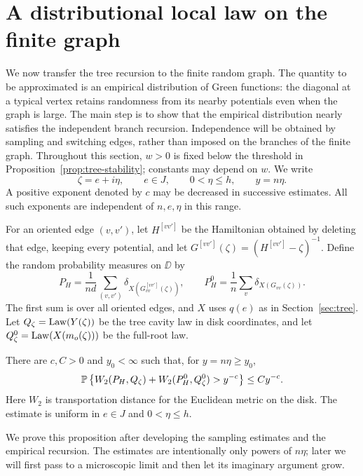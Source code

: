 \section{A distributional local law on the finite graph}
\label{sec:local-law}

We now transfer the tree recursion to the finite random graph.  The
quantity to be approximated is an empirical distribution of Green
functions: the diagonal at a typical vertex retains randomness from its
nearby potentials even when the graph is large.  The main step is to
show that the empirical distribution nearly satisfies the independent
branch recursion.  Independence will be obtained by sampling and
switching edges, rather than imposed on the branches of the finite graph.
Throughout this section, $w>0$ is fixed below the threshold in
Proposition~\ref{prop:tree-stability}; constants may depend on $w$.
We write
\[
 \zeta=e+i\eta,\qquad e\in J,\qquad 0<\eta\le h,
 \qquad y=n\eta.
\]
A positive exponent denoted by $c$ may be decreased in successive estimates.
All such exponents are independent of $n,e,\eta$ in this range.

For an oriented edge $(v,v')$, let $H^{[vv']}$ be the Hamiltonian obtained
by deleting that edge, keeping every potential, and let
$G^{[vv']}(\zeta)=(H^{[vv']}-\zeta)^{-1}$.  Define the random probability
measures on $\DD$ by
\begin{equation}\label{eq:empirical-cavity-laws}
 P_H=\frac1{nd}\sum_{(v,v')}\delta_{X(G^{[vv']}_{vv}(\zeta))},
 \qquad
 P_H^0=\frac1n\sum_v\delta_{X(G_{vv}(\zeta))}.
\end{equation}
The first sum is over all oriented edges, and $X$ uses $q(e)$ as in
Section~\ref{sec:tree}.  Let $Q_\zeta=\operatorname{Law}(Y(\zeta))$ be the tree cavity
law in disk coordinates, and let
$Q_\zeta^0=\operatorname{Law}(X(m_o(\zeta)))$ be the full-root law.

\begin{proposition}\label{prop:local-law}
There are $c,C>0$ and $y_0<\infty$ such that, for $y=n\eta\ge y_0$,
\begin{equation}\label{eq:distributional-local-law}
 \mathbb P\left\{
 W_2(P_H,Q_\zeta)+W_2(P_H^0,Q_\zeta^0)>y^{-c}
 \right\}\le Cy^{-c}.
\end{equation}
Here $W_2$ is transportation distance for the Euclidean metric on the
disk.  The estimate is uniform in $e\in J$ and $0<\eta\le h$.
\end{proposition}

We prove this proposition after developing the sampling estimates and
the empirical recursion.  The estimates are intentionally only powers
of $n\eta$; later we will first pass to a microscopic limit and then
let its imaginary argument grow.

